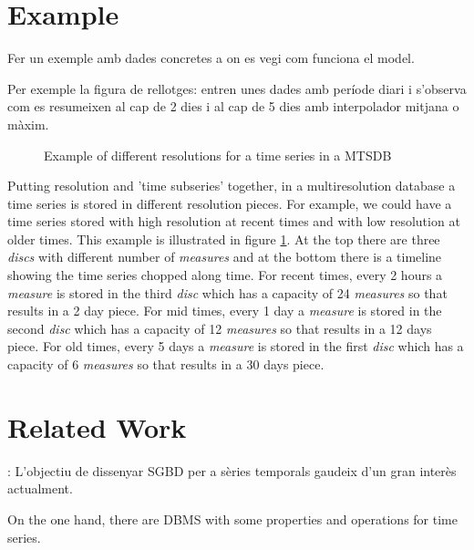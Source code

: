 \documentclass{scrartcl}
\newcommand{\imatges}{../../imatges}
\begin{document}








\section{Example}


Fer un exemple amb dades concretes a on es vegi com funciona el model.

Per exemple la figura de rellotges: entren unes dades amb període diari i s'observa com es resumeixen al cap de 2 dies i al cap de 5 dies amb interpolador mitjana o màxim.



\begin{figure}[tp]
\centering

\caption{Example of different resolutions for a time series in a MTSDB}
\label{fig:model:window}
\end{figure}


Putting resolution and 'time subseries' together, in a multiresolution database a time series is stored in different resolution pieces. For example, we could have a time series stored with high resolution at recent times and with low resolution at older times. This example is illustrated in figure \ref{fig:model:window}. At the top there are three \emph{discs} with different number of \emph{measures} and at the bottom there is a timeline showing the time series chopped along time. For recent times, every 2 hours a \emph{measure} is stored in the third \emph{disc} which has a capacity of 24 \emph{measures} so that results in a 2 day piece. For mid times, every 1 day a  \emph{measure} is stored in the second \emph{disc} which has a capacity of 12 \emph{measures} so that results in a 12 days piece. For old times, every 5 days a  \emph{measure} is stored in the first \emph{disc} which has a capacity of 6 \emph{measures} so that results in a 30 days piece. 


\section{Related Work}


: L'objectiu de dissenyar SGBD per a sèries temporals gaudeix d'un gran interès actualment.

On the one hand, there are DBMS with some properties and operations
for time series.
\end{document}
